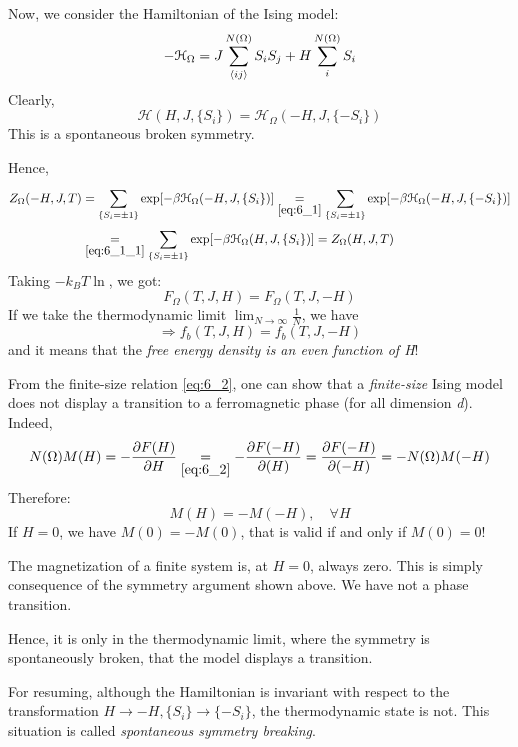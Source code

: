 \documentclass[../main/main.tex]{subfiles}
\begin{document}
Now, we consider the Hamiltonian of the Ising model:
\begin{equation*}
  - \mathcal{H}_ \Omega  = J \sum_{\expval{ij} }^{N(\Omega )} S_i S_j + H \sum_{i}^{N(\Omega )} S_i
\end{equation*}
Clearly,
\begin{equation}
  \mathcal{H}(H,J, \{S_i\}) =   \mathcal{H}_ \Omega (-H,J, \{-S_i\})
  \label{eq:6_1_1}
\end{equation}
This is a spontaneous broken symmetry.

Hence,
\begin{equation}
  \begin{split}
Z_ \Omega  (-H,J,T) &= \sum_{ \{S_i = \pm 1 \}}^{} \exp [-\beta \mathcal{H}_ \Omega  (-H,J, \{S_i\})]  \underset{\eqref{eq:6_1}}{=}   \sum_{ \{S_i = \pm 1 \}}^{} \exp [-\beta \mathcal{H}_ \Omega  (-H,J,\{-S_i\})] \\
&\underset{\eqref{eq:6_1_1}}{=} \sum_{ \{S_i= \pm 1\}}^{} \exp [-\beta \mathcal{H}_ \Omega  (H,J, \{S_i\}) ] = Z_ \Omega (H,J,T)
\end{split}
\end{equation}
Taking \( -k_B T \ln  \), we got:
\begin{equation}
  F_ \Omega  (T,J,H) = F_ \Omega  (T,J,-H)
  \label{eq:6_2}
\end{equation}
If we take the thermodynamic limit \( \lim_{N \rightarrow \infty } \frac{1}{N} \), we have
\begin{equation}
\Rightarrow f_b (T,J,H) = f_b (T,J,-H)
\end{equation}
and it means that the \emph{free energy density is an even function of H}!
\begin{remark}
From the finite-size relation \eqref{eq:6_2}, one can show that a \emph{finite-size}  Ising model does not display a transition to a ferromagnetic phase (for all dimension \emph{d}). Indeed,
\begin{equation}
    N (\Omega ) M(H) = - \pdv{F (H)}{H} \underset{\eqref{eq:6_2}}{=}  - \pdv{F(-H)}{(H)} = \pdv{F(-H)}{(-H)}  = - N (\Omega ) M (-H)
\end{equation}
Therefore:
\begin{equation}
  M (H) = - M (-H), \quad \forall H
\end{equation}
If \( H=0 \), we have \( M (0) = -M (0) \), that is valid if and only if \( M(0)= 0 \)!

The magnetization of a finite system is, at \( H=0 \), always zero. This is simply consequence of the symmetry argument shown above. We have not a phase transition.

Hence, it is only in the thermodynamic limit, where the symmetry is spontaneously broken, that the model displays a transition.

For resuming, although the Hamiltonian is invariant with respect to the transformation \( H \rightarrow -H, \{ S_i \} \rightarrow \{-S_i\} \), the thermodynamic state is not. This situation is called \emph{spontaneous symmetry breaking}.
\end{remark}
\end{document}
